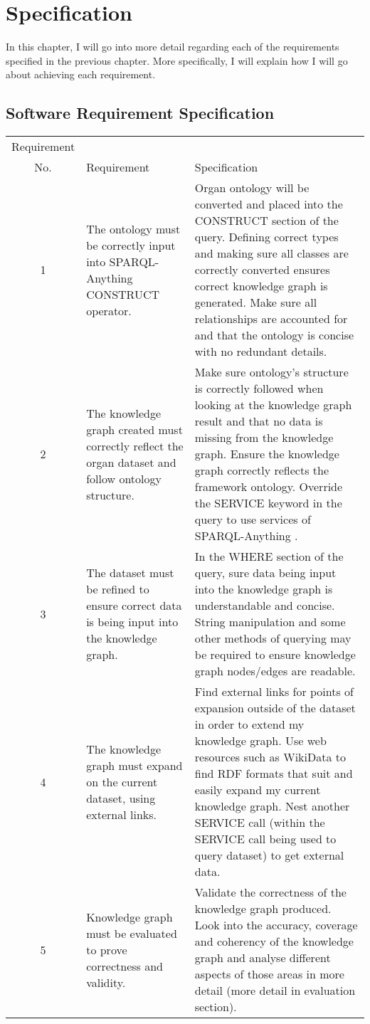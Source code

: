 \chapter{Specification}
In this chapter, I will go into more detail regarding each of the requirements specified in the previous chapter. More specifically, I will explain how I will go about achieving each requirement. 

\begin{table}[h!]
\section{Software Requirement Specification}

\begin{center}
\begin{tabular}{c|p{2in}p{2.55in}}
Requirement \\ No.&Requirement&Specification\\\hline 
1 & 
The ontology must be correctly input into SPARQL-Anything CONSTRUCT operator. &
Organ ontology will be converted and placed into the CONSTRUCT section of the query. Defining correct types and making sure all classes are correctly converted ensures correct knowledge graph is generated. Make sure all relationships are accounted for and that the ontology is concise with no redundant details. \\
2&
The knowledge graph created must correctly reflect the organ dataset and follow ontology structure. &
Make sure ontology's structure is correctly followed when looking at the knowledge graph result and that no data is missing from the knowledge graph. Ensure the knowledge graph correctly reflects the framework ontology. Override the SERVICE keyword in the query to use services of SPARQL-Anything .  \\
3&
The dataset must be refined to ensure correct data is being input into the knowledge graph. &
In the WHERE section of the query, sure data being input into the knowledge graph is understandable and concise. String manipulation and some other methods of querying may be required to ensure knowledge graph nodes/edges are readable. \\
4&
The knowledge graph must expand on the current dataset, using external links. &
Find external links for points of expansion outside of the dataset in order to extend my knowledge graph. Use web resources such as WikiData to find RDF formats that suit and easily expand my current knowledge graph. Nest another SERVICE call (within the SERVICE call being used to query dataset) to get external data. \\
5&
Knowledge graph must be evaluated to prove correctness and validity. &
Validate the correctness of the knowledge graph produced. Look into the accuracy, coverage and coherency of the knowledge graph and analyse different aspects of those areas in more detail (more detail in evaluation section). 

\end{tabular}
\end{center}
\end{table}

